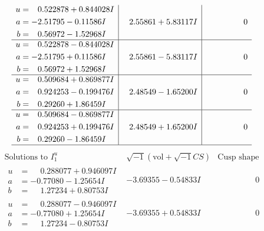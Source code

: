 \documentclass[1p]{elsarticle_modified}
\theoremstyle{definition}
\newcommand{\I}{\sqrt{-1}}
\begin{document}
$$\begin{array}{c|c|c}
\begin{aligned}
u &= \phantom{-}0.522878 + 0.844028 I \\
a &= -2.51795 - 0.11586 I \\
b &= \phantom{-}0.56972 - 1.52968 I\end{aligned}
 & \phantom{-}2.55861 + 5.83117 I & \phantom{-0.000000 } 0 \\ \hline\begin{aligned}
u &= \phantom{-}0.522878 - 0.844028 I \\
a &= -2.51795 + 0.11586 I \\
b &= \phantom{-}0.56972 + 1.52968 I\end{aligned}
 & \phantom{-}2.55861 - 5.83117 I & \phantom{-0.000000 } 0 \\ \hline\begin{aligned}
u &= \phantom{-}0.509684 + 0.869877 I \\
a &= \phantom{-}0.924253 - 0.199476 I \\
b &= \phantom{-}0.29260 + 1.86459 I\end{aligned}
 & \phantom{-}2.48549 - 1.65200 I & \phantom{-0.000000 } 0 \\ \hline\begin{aligned}
u &= \phantom{-}0.509684 - 0.869877 I \\
a &= \phantom{-}0.924253 + 0.199476 I \\
b &= \phantom{-}0.29260 - 1.86459 I\end{aligned}
 & \phantom{-}2.48549 + 1.65200 I & \phantom{-0.000000 } 0\\
 \hline 
 \end{array}$$\newpage$$\begin{array}{c|c|c}  
\text{Solutions to }I^u_{1}& \I (\text{vol} + \sqrt{-1}CS) & \text{Cusp shape}\\
 \hline 
\begin{aligned}
u &= \phantom{-}0.288077 + 0.946097 I \\
a &= -0.77080 - 1.25654 I \\
b &= \phantom{-}1.27234 + 0.80753 I\end{aligned}
 & -3.69355 - 0.54833 I & \phantom{-0.000000 } 0 \\ \hline\begin{aligned}
u &= \phantom{-}0.288077 - 0.946097 I \\
a &= -0.77080 + 1.25654 I \\
b &= \phantom{-}1.27234 - 0.80753 I\end{aligned}
 & -3.69355 + 0.54833 I & \phantom{-0.000000 } 0 \\ \hline\begin{aligned}

\end{aligned}
\end{array}$$
\end{document}
